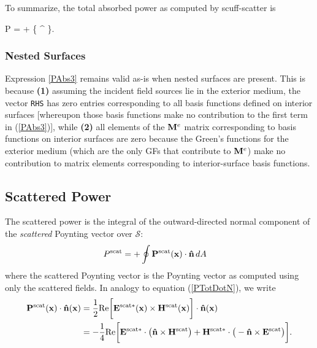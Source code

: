 \documentclass[letterpaper]{article}
\newcommand\supsstar[1]{^{\hbox{\scriptsize{#1}}*}}
\begin{document}
To summarize, the total absorbed power as computed by 
{\sc scuff-scatter} is 

{P = +
   \bigg\{ ^\dagger 
           \cdot 
   \bigg\}.
}

\subsubsection*{Nested Surfaces}

Expression \ref{PAbs3} remains valid as-is when nested
surfaces are present. 
This is because \textbf{(1)} assuming the incident field
sources lie in the exterior medium, the vector \texttt{RHS}
has zero entries corresponding to all basis functions 
defined on interior surfaces [whereupon those basis 
functions make no contribution to the first term in 
(\ref{PAbs3})], while \textbf{(2)} all elements of the $\mathbf{M}^{e}$ 
matrix corresponding to basis functions on interior surfaces
are zero because the Green's functions for the exterior
medium (which are the only GFs that contribute to $\mathbf{M}^{e}$)
make no contribution to matrix elements corresponding to 
interior-surface basis functions. 

\subsection{Scattered Power}

The scattered power is the integral of the outward-directed normal 
component of the \textit{scattered} Poynting vector over 
$\mathcal{S}$:
\begin{align}
 P^{\hbox{\scriptsize{scat}}} 
&= + \oint \mathbf{P}^{\hbox{\scriptsize{scat}}}(\mathbf{x}) \cdot \mathbf{\hat n} \, dA 
\label{ScatteredPower}
\end{align}
where the scattered Poynting vector is the 
Poynting vector as computed using only the scattered fields.
In analogy to equation (\ref{PTotDotN}), we write
\begin{align}
 \vb P\sups{scat}(\vb x) \cdot \vbhat{n}(\vb x)
  &=\frac{1}{2}\text{Re} 
    \bigg[ \vb E\supsstar{scat}(\vb x) \times \vb H\sups{scat}(\vb x)\bigg] 
    \cdot \vbhat{n}(\vb x)
\\
  &=-\frac{1}{4}\text{Re}
     \bigg[ \vb E\supsstar{scat} \cdot \big(\vbhat{n}\times \vb H\sups{scat} \big)
           +\vb H\supsstar{scat} \cdot \big(-\vbhat{n}\times \vb E\sups{scat} \big) 
     \bigg].
\nonumber
\end{align}
\end{document}
